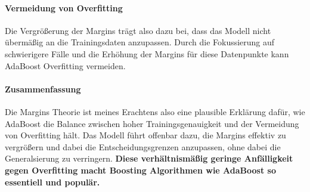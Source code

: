 \paragraph{Vermeidung von Overfitting}
Die Vergrößerung der Margins trägt also dazu bei, dass das Modell nicht übermäßig an die Trainingsdaten anzupassen. Durch die Fokussierung auf schwierigere Fälle und die Erhöhung der Margins für diese Datenpunkte kann AdaBoost Overfitting vermeiden. 

\paragraph{Zusammenfassung}
Die Margins Theorie ist meines Erachtens also eine plausible Erklärung dafür, wie AdaBoost die Balance zwischen hoher Trainingsgenauigkeit und der Vermeidung von Overfitting hält. Das Modell führt offenbar dazu, die Margins effektiv zu vergrößern und dabei die Entscheidungsgrenzen anzupassen, ohne dabei die Generalsierung zu verringern. \textbf{Diese verhältnismäßig geringe Anfälligkeit gegen Overfitting macht Boosting Algorithmen wie AdaBoost so essentiell und populär.}

